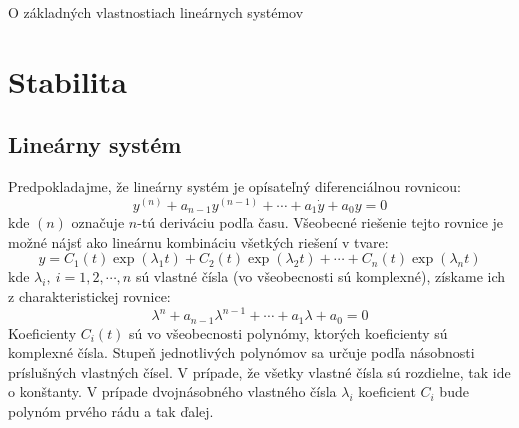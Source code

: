 \documentclass[a4paper, 10pt, ]{article}
\begin{document}
\begin{flushleft}
    O základných vlastnostiach lineárnych systémov
\end{flushleft}

\bigskip

\normalsize
\normalfont



\section{Stabilita}


\subsection{Lineárny systém}
\label{Stability.LinearSystem}

Predpokladajme, že lineárny systém je opísateľný diferenciálnou rovnicou:
\begin{equation}
    y^{(n)} + a_{n - 1} y^{(n - 1)} + \cdots + a_{1} \dot{y} + a_{0} y = 0    
\end{equation}
kde $(n)$ označuje $n$-tú deriváciu podľa času. Všeobecné riešenie tejto rovnice je možné nájsť ako lineárnu kombináciu všetkých riešení v tvare:
\begin{equation}
    \label{Stability.LinearSystem.Equation:LDESolution}
    y = 
    C_{1}(t) \exp(\lambda_{1} t) + C_{2}(t) \exp(\lambda_{2} t) + \cdots + C_{n}(t) \exp(\lambda_{n} t)
\end{equation}
kde $\lambda_{i}, \ i = 1, 2, \cdots, n$ sú vlastné čísla (vo všeobecnosti sú komplexné), získame ich z charakteristickej rovnice:
\begin{equation}
    \lambda^{n} + a_{n - 1} \lambda^{n - 1} + \cdots + a_{1} \lambda + a_{0} = 0    
\end{equation} 
Koeficienty $C_i(t)$ sú vo všeobecnosti polynómy, ktorých koeficienty sú komplexné čísla. Stupeň jednotlivých polynómov sa určuje podľa násobnosti príslušných vlastných čísel. V prípade, že všetky vlastné čísla sú rozdielne, tak ide o konštanty. V prípade dvojnásobného vlastného čísla $\lambda_{i}$ koeficient $C_{i}$ bude polynóm prvého rádu a tak ďalej.
\end{document}
